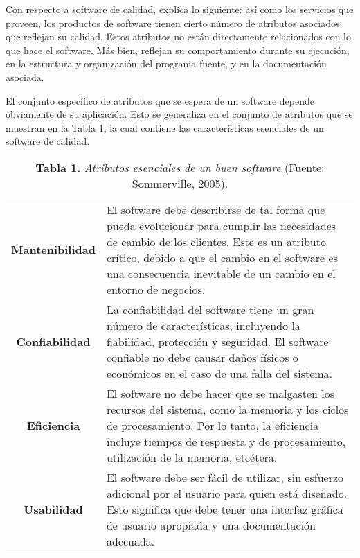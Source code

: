 Con respecto a software de calidad, \cite{Sommerville} explica lo siguiente: as\'{i} como los servicios que proveen, los productos de software tienen cierto n\'{u}mero de atributos asociados que reflejan su calidad. Estos atributos no est\'{a}n directamente relacionados con lo que hace el software. M\'{a}s bien, reflejan su comportamiento durante su ejecuci\'{o}n, en la estructura y organizaci\'{o}n del programa fuente, y en la documentaci\'{o}n asociada.

El conjunto espec\'{i}fico de atributos que se espera de un software depende obviamente de su aplicaci\'{o}n. Esto se generaliza en el conjunto de atributos que se muestran en la Tabla 1, la cual contiene las caracter\'{i}sticas esenciales de un software de calidad.

		\begin{table}[htb]
			\caption{\textbf{Tabla 1.} \textit{Atributos esenciales de un buen software} (Fuente: Sommerville, 2005).}
			\label{tabla_1}
			\centering
			\setlength{\extrarowheight}{3.5pt}
			\begin{tabulary}{15cm}{|c|J|}
				\hline
				 & \\ \hline
			\textbf{Mantenibilidad} & El software debe describirse de tal forma que pueda evolucionar  para cumplir las necesidades de cambio de los 					clientes. Este es un atributo cr\'{i}tico, debido a que el cambio en el software es una consecuencia inevitable de un cambio en el entorno de negocios.\\ \hline
			\textbf{Confiabilidad} & La confiabilidad del software tiene un gran n\'{u}mero de caracter\'{i}sticas, incluyendo la fiabilidad, protecci\'{o}n y seguridad. El software confiable no debe causar da\~{n}os f\'{i}sicos o econ\'{o}micos en el caso de una falla del sistema.\\ \hline
			\textbf{Eficiencia} & El software no debe hacer que se malgasten los recursos del sistema, como la memoria y los ciclos de procesamiento. Por lo tanto, la eficiencia incluye tiempos de respuesta y de procesamiento, utilizaci\'{o}n de la memoria, etc\'{e}tera.\\ \hline
			\textbf{Usabilidad} & El software debe ser f\'{a}cil de utilizar, sin esfuerzo adicional por el usuario para quien est\'{a} dise\~{n}ado. Esto significa que debe tener una interfaz gr\'{a}fica de usuario apropiada y una documentaci\'{o}n adecuada.\\ \hline
			\end{tabulary}
		\end{table}
		\FloatBarrier %

